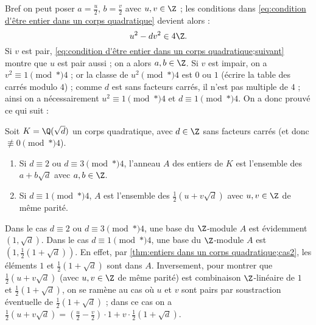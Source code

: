 \documentclass[11pt, useosf,
  title in boldface,
  theorem in new line,
  theorem numbering = section,
  number theorems separately,
]{simplivre}
\begin{document}
    Bref on peut poser \( a = \frac{u}{2} \), \( b = \frac{v}{2} \) avec \( u,v \in \Z \) ; les conditions dans \eqref{eq:condition d'être entier dans un corps quadratique} devient alors :
    \begin{equation}\label{eq:condition d'être entier dans un corps quadratique;suivant}
        u^2 - d v^2 \in 4\Z.
    \end{equation}
    Si \( v \) est pair, \eqref{eq:condition d'être entier dans un corps quadratique;suivant} montre que \( u \) est pair aussi ; on a alors \( a, b \in \Z \). Si \( v \) est impair, on a \( v^2 \equiv 1 \pmod*{4} \) ; or la classe de \( u^2 \pmod*{4} \) est \( 0 \) ou \( 1 \) (écrire la table des carrés modulo \( 4 \)) ; comme \( d \) est sans facteurs carrés, il n'est pas multiple de \( 4 \) ; ainsi on a nécessairement \( u^2 \equiv 1 \pmod*{4} \) et \( d \equiv 1 \pmod*{4} \). On a donc prouvé ce qui suit :
    \begin{theorem}\label{thm:entiers dans un corps quadratique}
        Soit \( K = \Q(\sqrt{d}) \) un corps quadratique, avec \( d \in \Z \) sans facteurs carrés (et donc \( \not\equiv 0 \pmod*{4} \)).
        \begin{enumerate}
            \item \label{thm:entiers dans un corps quadratique;cas1} Si \( d \equiv 2 \) ou \( d \equiv 3 \pmod*{4} \), l'anneau \( A \) des entiers de \( K \) est l'ensemble des \( a+b\sqrt{d} \) avec \( a,b \in \Z \).
            \item \label{thm:entiers dans un corps quadratique;cas2} Si \( d \equiv 1 \pmod*{4} \), \( A \) est l'ensemble des \( \frac{1}{2}(u+v\sqrt{d}) \) avec \( u,v \in \Z \) de même parité.
        \end{enumerate}
    \end{theorem}

    Dans le cas \( d \equiv 2 \) ou \( d \equiv 3 \pmod*{4} \), une base du \( \Z \)‑module \( A \) est évidemment \( (1,\sqrt{d}) \). Dans le cas \( d \equiv 1 \pmod*{4} \), une base du \( \Z \)‑module \( A \) est \( \left(1, \frac{1}{2}(1+\sqrt{d})\right) \). En effet, par \ref{thm:entiers dans un corps quadratique;cas2}, les éléments \( 1 \) et \( \frac{1}{2}(1+\sqrt{d}) \) sont dans \( A \). Inversement, pour montrer que \( \frac{1}{2}(u+v\sqrt{d}) \) (avec \( u,v \in \Z \) de même parité) est combinaison \( \Z \)‑linéaire de \( 1 \) et \( \frac{1}{2}(1+\sqrt{d}) \), on se ramène au cas où \( u \) et \( v \) sont pairs par soustraction éventuelle de \( \frac{1}{2}(1+\sqrt{d}) \) ; dans ce cas on a \( \frac{1}{2}(u+v\sqrt{d}) = \left(\frac{u}{2}-\frac{v}{2}\right) \cdot 1 + v \cdot \frac{1}{2}(1+\sqrt{d}) \).
\end{document}
